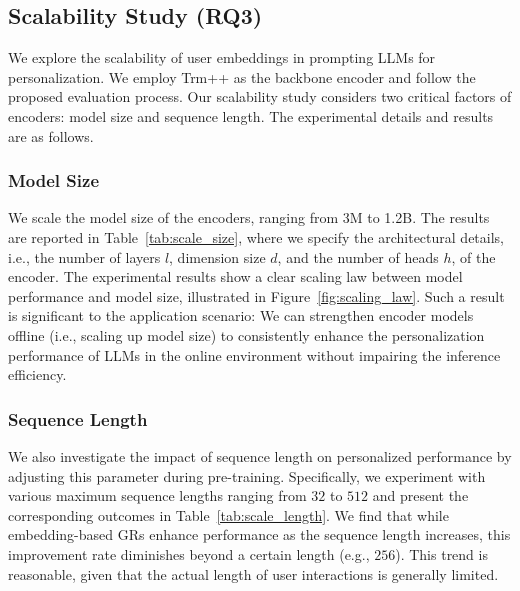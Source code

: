 \subsection{Scalability Study (RQ3)}
We explore the scalability of user embeddings in prompting LLMs for personalization. We employ Trm++ as the backbone encoder and follow the proposed evaluation process. Our scalability study considers two critical factors of encoders: model size and sequence length. The experimental details and results are as follows.

\subsubsection{\textbf{Model Size}} 
We scale the model size of the encoders, ranging from 3M to 1.2B. The results are reported in Table~\ref{tab:scale_size}, where we specify the architectural details, i.e., the number of layers $l$, dimension size $d$, and the number of heads $h$, of the encoder. The experimental results show a clear scaling law between model performance and model size, illustrated in Figure~\ref{fig:scaling_law}. Such a result is significant to the application scenario: We can strengthen encoder models offline (i.e., scaling up model size) to consistently enhance the personalization performance of LLMs in the online environment without impairing the inference efficiency.

\subsubsection{\textbf{Sequence Length}} 
We also investigate the impact of sequence length on personalized performance by adjusting this parameter during pre-training. Specifically, we experiment with various maximum sequence lengths ranging from $32$ to $512$ and present the corresponding outcomes in Table~\ref{tab:scale_length}. We find that while embedding-based GRs enhance performance as the sequence length increases, this improvement rate diminishes beyond a certain length (e.g., $256$). This trend is reasonable, given that the actual length of user interactions is generally limited.


